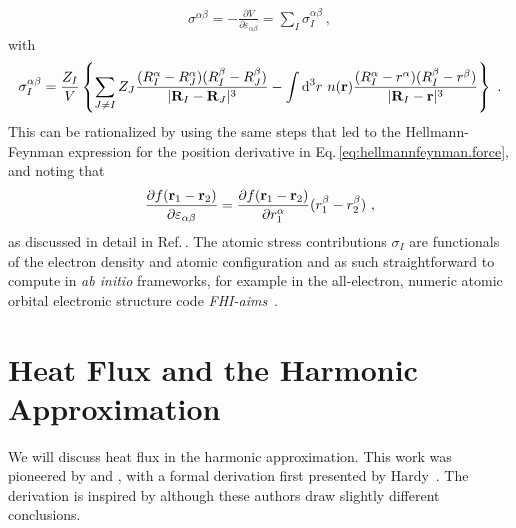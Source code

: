 \begin{align}
  \sigma^{\alpha \beta} 
    = - \frac{\partial V}{\partial \varepsilon_{\alpha \beta}}
    = \sum_I \sigma_I^{\alpha \beta}~,
  \label{eq:hf.sigma}
\end{align}
with
\begin{align}
  \sigma_I^{\alpha \beta}
    = \frac{Z_I}{V}
        \left\{ 
        \sum_{J \neq I} Z_J \frac{(R_I^\alpha - R_J^\alpha) (R_I^\beta - R_J^\beta)}{\lvert \b R_I - \b R_J \rvert^3}
        - \int \d^3 r ~ n(\b r) \frac{(R_I^\alpha - r^\alpha) (R_I^\beta - r^\beta)}{\lvert \b R_I - \b r \vert^3}
        \right\}~.
  \label{eq:hf.sigma_I}
\end{align}
This can be rationalized by using the same steps that led to the Hellmann-Feynman expression for the position derivative in Eq.\,\eqref{eq:hellmannfeynman.force}, and noting that
\begin{align}
  \frac{\partial f (\b r_1 - \b r_2)}{\partial \varepsilon_{\alpha \beta}}
    = \frac{\partial f (\b r_1 - \b r_2)}{\partial r_1^\alpha} (r_1^\beta - r_2 ^\beta)~,
  \label{eq:strain.derivative}
\end{align}
as discussed in detail in Ref.\,\cite{Knuth2015}.
The atomic stress contributions $\sigma_I$ are functionals of the electron density and atomic configuration and as such straightforward to compute in \emph{ab initio} frameworks, for example in the all-electron, numeric atomic orbital electronic structure code \emph{FHI-aims}~\cite{FHI-aims,Knuth2015}.


\section{Heat Flux and the Harmonic Approximation}

We will discuss heat flux in the harmonic approximation. This work was pioneered by  and , with a formal derivation first presented by Hardy~\cite{Hardy1963}. The derivation is inspired by  although these authors draw slightly different conclusions.


